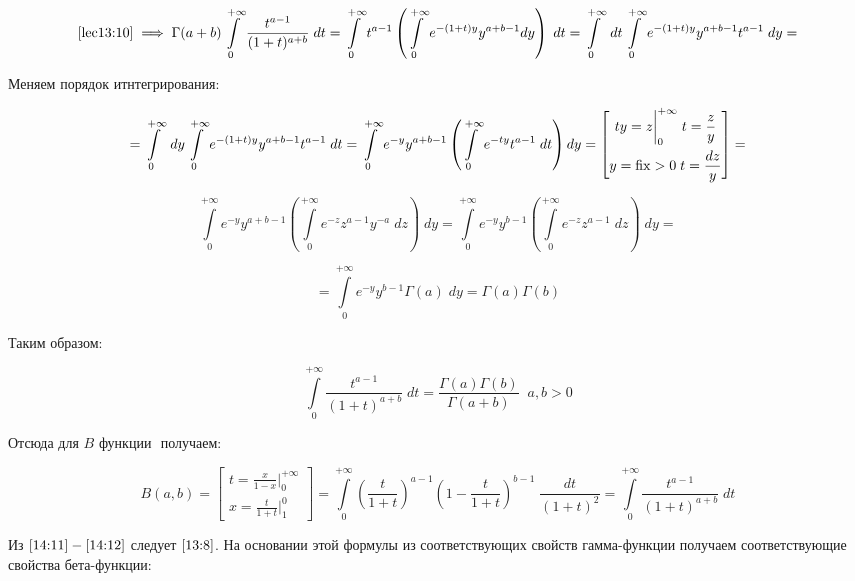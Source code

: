 \documentclass[../../main.tex]{subfiles}
\begin{document}
\[ \eqref{lec13:10} \implies \Gamma (a+b) \int\limits_{0}^{+\infty} \frac{ 
t^{a-1} }{ (1+t)^{a+b} } \; dt = \int\limits_{0}^{+\infty} t^{a-1} \left(  
\int\limits_{0}^{+\infty} e^{-(1+t)y } y^{a+b-1} dy \right) \; dt =  
\int\limits_{0}^{+\infty} \; dt  \int\limits_{0}^{+\infty} e^{ -(1+t)y } 
y^{a+b-1}  t^{a-1} \; dy = \]

Меняем порядок итнтегрирования:

\[ =  \int\limits_{0}^{+\infty} \; dy \int\limits_{0}^{+\infty} e^{ -(1+t)y } 
y^{a+b-1} t^{a-1} \; dt  = \int\limits_{0}^{+\infty} e^{-y} y^{a+b-1} \left( 
\int\limits_{0}^{+\infty} e^{-ty} t^{a-1} \; dt \right) dy = \left[  
\begin{gathered}
									ty = z \bigg|_{0}^{+\infty} \; t = \frac{z}{y}\\
									y = \operatorname{fix} > 0 \; t = \frac{dz}{y} 
										\end{gathered} \right] =   \]

\[  \int\limits_{0}^{+\infty} e^{-y} y^{a+b-1} \left( 
\int\limits_{0}^{+\infty} e^{-z} z^{a-1} y^{-a}  \; dz   \right) \; dy = 
\int\limits_{0}^{+\infty} e^{-y} y^{b-1} \left( \int\limits_{0}^{+\infty} 
e^{-z} z^{a-1}  \; dz \right) \; dy  =  \]


\[ = \int\limits_{0}^{+\infty} e^{-y} y^{b-1} \Gamma(a) \; dy = \Gamma(a) 
\Gamma(b)  \]

Таким образом:

\begin{equation}
	\label{14:11}
	\int\limits_{0}^{+\infty} \frac{ t^{a-1} }{ (1+t)^{a+b} } \; dt = 
	\frac{\Gamma(a) \Gamma(b)}{\Gamma(a+b)} \; \; a,b > 0
\end{equation}

Отсюда для $B$ функции $\label{13:6}$ получаем: 

\begin{equation}
\label{14:12}
   B(a,b) = \left[  \begin{gathered}
t = \frac{x}{1-x} \bigg|_{0}^{+\infty}\\
x = \frac{t}{1+t}  \bigg|_{1}^{0} 
\end{gathered}   \right]   = \int\limits_{0}^{+\infty} \left(  \frac{t}{1+t} 
\right)^{a-1} \left(1 - \frac{t}{1+t} \right)^{b-1} \; \frac{dt}{\left( 1+t 
\right)^2} = \int\limits_{0}^{+\infty} \frac{t^{a-1}}{\left( 1+t 
\right)^{a+b}} \; dt 
\end{equation}

Из  $\eqref{14:11} - \eqref{14:12}$ следует $\eqref{13:8}$. На основании этой 
формулы из соответствующих свойств гамма-функции получаем соответствующие 
свойства бета-функции:
\end{document}
